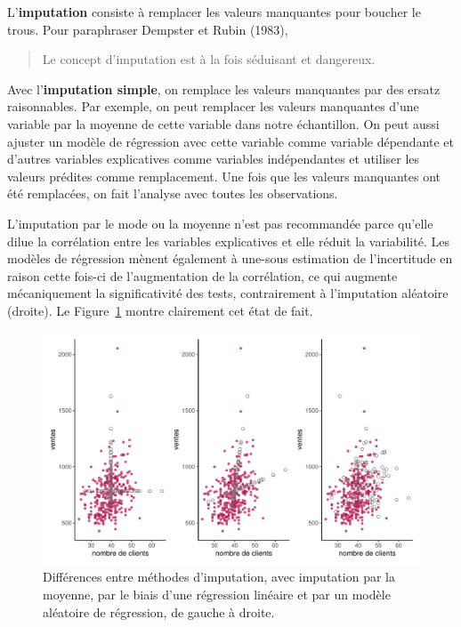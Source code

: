 \documentclass[
  11pt,
  letterpaper,
]{scrbook}
\theoremstyle{definition}
\theoremstyle{remark}
\begin{document}
L'\textbf{imputation} consiste à remplacer les valeurs manquantes pour
boucher le trous. Pour paraphraser Dempster et Rubin (1983),

\begin{quote}
Le concept d'imputation est à la fois séduisant et dangereux.
\end{quote}

Avec l'\textbf{imputation simple}, on remplace les valeurs manquantes
par des ersatz raisonnables. Par exemple, on peut remplacer les valeurs
manquantes d'une variable par la moyenne de cette variable dans notre
échantillon. On peut aussi ajuster un modèle de régression avec cette
variable comme variable dépendante et d'autres variables explicatives
comme variables indépendantes et utiliser les valeurs prédites comme
remplacement. Une fois que les valeurs manquantes ont été remplacées, on
fait l'analyse avec toutes les observations.

L'imputation par le mode ou la moyenne n'est pas recommandée parce
qu'elle dilue la corrélation entre les variables explicatives et elle
réduit la variabilité. Les modèles de régression mènent également à
une-sous estimation de l'incertitude en raison cette fois-ci de
l'augmentation de la corrélation, ce qui augmente mécaniquement la
significativité des tests, contrairement à l'imputation aléatoire
(droite). Le Figure~\ref{fig-imputation} montre clairement cet état de
fait.

\begin{figure}[ht!]

{\centering \includegraphics[width=1\textwidth,height=\textheight]{./07-donneesmanquantes_files/figure-pdf/fig-imputation-1.pdf}

}

\caption{\label{fig-imputation}Différences entre méthodes d'imputation,
avec imputation par la moyenne, par le biais d'une régression linéaire
et par un modèle aléatoire de régression, de gauche à droite.}

\end{figure}
\end{document}
